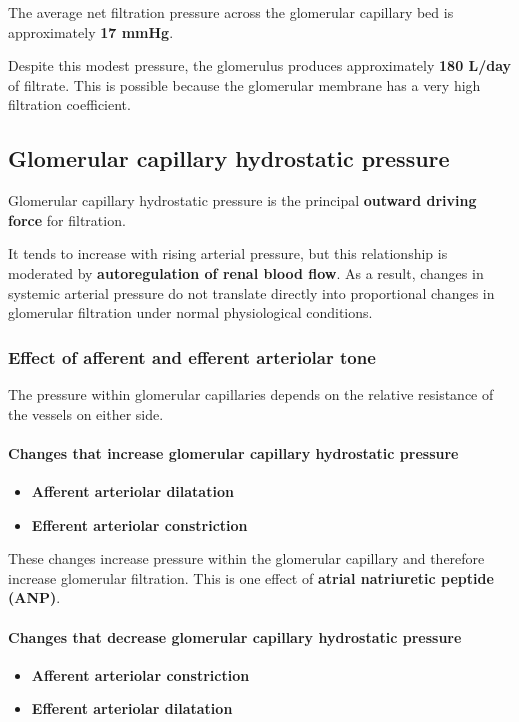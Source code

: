 \documentclass[11pt,a4paper]{article}
\begin{document}
The average net filtration pressure across the glomerular capillary bed is approximately \textbf{17 mmHg}.

Despite this modest pressure, the glomerulus produces approximately \textbf{180 L/day} of filtrate. This is possible because the glomerular membrane has a very high filtration coefficient.

\subsection{Glomerular capillary hydrostatic pressure}

Glomerular capillary hydrostatic pressure is the principal \textbf{outward driving force} for filtration.

It tends to increase with rising arterial pressure, but this relationship is moderated by \textbf{autoregulation of renal blood flow}. As a result, changes in systemic arterial pressure do not translate directly into proportional changes in glomerular filtration under normal physiological conditions.

\subsubsection{Effect of afferent and efferent arteriolar tone}

The pressure within glomerular capillaries depends on the relative resistance of the vessels on either side.

\paragraph{Changes that increase glomerular capillary hydrostatic pressure}
\begin{itemize}
    \item \textbf{Afferent arteriolar dilatation}
    \item \textbf{Efferent arteriolar constriction}
\end{itemize}

These changes increase pressure within the glomerular capillary and therefore increase glomerular filtration. This is one effect of \textbf{atrial natriuretic peptide (ANP)}.

\paragraph{Changes that decrease glomerular capillary hydrostatic pressure}
\begin{itemize}
    \item \textbf{Afferent arteriolar constriction}
    \item \textbf{Efferent arteriolar dilatation}
\end{itemize}
\end{document}
